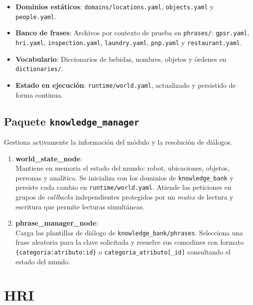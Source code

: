 \begin{itemize}
    \item \textbf{Dominios estáticos}: \texttt{domains/locations.yaml}, \texttt{objects.yaml} y \texttt{people.yaml}.
    \item \textbf{Banco de frases}: Archivos por contexto de prueba en \texttt{phrases/}: \texttt{gpsr.yaml}, \texttt{hri.yaml}, \texttt{inspection.yaml}, \texttt{laundry.yaml}, \texttt{pnp.yaml} y \texttt{restaurant.yaml}.
    \item \textbf{Vocabulario}: Diccionarios de bebidas, nombres, objetos y órdenes en \texttt{dictionaries/}.
    \item \textbf{Estado en ejecución}: \texttt{runtime/world.yaml}, actualizado y persistido de forma continua.
\end{itemize}

\subsection{Paquete \texttt{knowledge\_manager}}
Gestiona activamente la información del módulo y la resolución de diálogos.

\begin{enumerate}
    \item \textbf{world\_state\_node}: \\
    Mantiene en memoria el estado del mundo: robot, ubicaciones, objetos, personas y analítica. Se inicializa con los dominios de \texttt{knowledge\_bank} y persiste cada cambio en \texttt{runtime/world.yaml}. Atiende las peticiones en grupos de \textit{callbacks} independientes protegidos por un \textit{mutex} de lectura y escritura que permite lecturas simultáneas.

    \item \textbf{phrase\_manager\_node}: \\
    Carga las plantillas de diálogo de \texttt{knowledge\_bank/phrases}. Selecciona una frase aleatoria para la clave solicitada y resuelve sus comodines con formato \texttt{\{categoria:atributo:id\}} o \texttt{categoria\_atributo[\_id]} consultando el estado del mundo.
\end{enumerate}


\section[HRI]{HRI}
\label{app:justina_hri}

